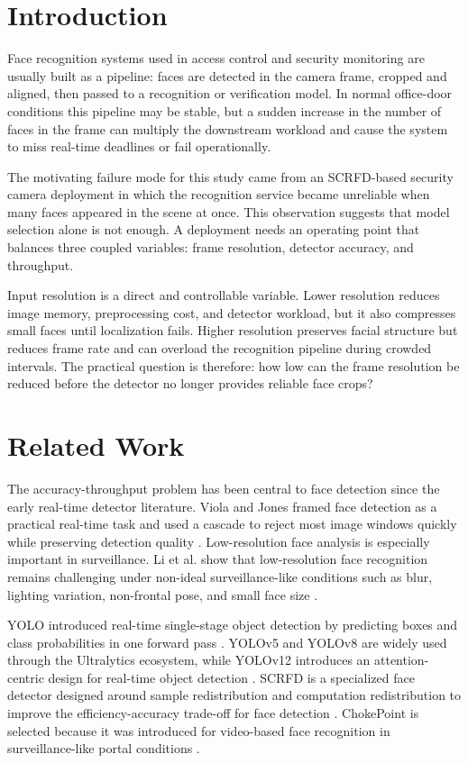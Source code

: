 \documentclass[conference]{IEEEtran}
\begin{document}
\section{Introduction}
Face recognition systems used in access control and security monitoring are usually built as a pipeline: faces are detected in the camera frame, cropped and aligned, then passed to a recognition or verification model. In normal office-door conditions this pipeline may be stable, but a sudden increase in the number of faces in the frame can multiply the downstream workload and cause the system to miss real-time deadlines or fail operationally.

The motivating failure mode for this study came from an SCRFD-based security camera deployment in which the recognition service became unreliable when many faces appeared in the scene at once. This observation suggests that model selection alone is not enough. A deployment needs an operating point that balances three coupled variables: frame resolution, detector accuracy, and throughput.

Input resolution is a direct and controllable variable. Lower resolution reduces image memory, preprocessing cost, and detector workload, but it also compresses small faces until localization fails. Higher resolution preserves facial structure but reduces frame rate and can overload the recognition pipeline during crowded intervals. The practical question is therefore: how low can the frame resolution be reduced before the detector no longer provides reliable face crops?

\section{Related Work}
The accuracy-throughput problem has been central to face detection since the early real-time detector literature. Viola and Jones framed face detection as a practical real-time task and used a cascade to reject most image windows quickly while preserving detection quality \cite{viola2004robust}. Low-resolution face analysis is especially important in surveillance. Li et al. show that low-resolution face recognition remains challenging under non-ideal surveillance-like conditions such as blur, lighting variation, non-frontal pose, and small face size \cite{li2018lowreswild}.

YOLO introduced real-time single-stage object detection by predicting boxes and class probabilities in one forward pass \cite{redmon2016yolo}. YOLOv5 and YOLOv8 are widely used through the Ultralytics ecosystem, while YOLOv12 introduces an attention-centric design for real-time object detection \cite{jocher2020yolov5,reis2023yolov8,tian2025yolov12}. SCRFD is a specialized face detector designed around sample redistribution and computation redistribution to improve the efficiency-accuracy trade-off for face detection \cite{guo2021scrfd}. ChokePoint is selected because it was introduced for video-based face recognition in surveillance-like portal conditions \cite{wong2011chokepoint}.
\end{document}
